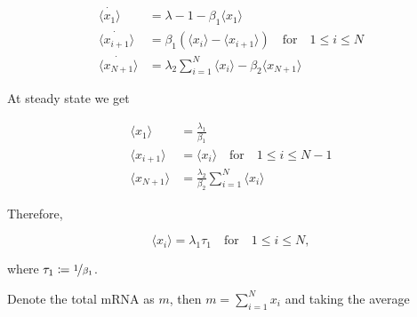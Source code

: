 \begin{equation}
  \begin{split}
    \dot{\langle x_1\rangle} &= \lambda-1 -\beta_1\langle x_1\rangle\\
    \dot{\langle x_{i+1}\rangle} &= \beta_1\left(\langle x_i\rangle - \langle x_{i+1}\rangle\right)\quad\text{for}\quad 1\leq i\leq N\\
    \dot{\langle x_{N+1}\rangle} &= \lambda_2\sum_{i=1}^N\langle x_i\rangle-\beta_2\langle x_{N+1}\rangle
  \end{split}
\end{equation}

At steady state we get

\begin{equation}
  \begin{split}
    \langle x_1\rangle &= \frac{\lambda_1}{\beta_1}\\
    \langle x_{i+1}\rangle &= \langle x_i\rangle\quad\text{for}\quad 1\leq i\leq N-1\\
    \langle x_{N+1}\rangle &= \frac{\lambda_2}{\beta_2}\sum_{i=1}^N\langle x_i\rangle
  \end{split}
\end{equation}

Therefore,

\begin{equation}
  \langle x_i\rangle = \lambda_1\tau_1\quad\text{for}\quad 1\leq i\leq N,
\end{equation}

where $\tau_1 \coloneqq \nicefrac{1}{\beta_1}$.

Denote the total mRNA as $m$, then $m=\sum_{i=1}^Nx_i$ and taking the average
